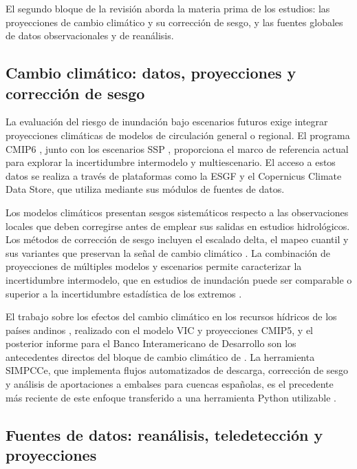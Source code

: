 El segundo bloque de la revisión aborda la materia prima de los estudios: las proyecciones de cambio climático y su corrección de sesgo, y las fuentes globales de datos observacionales y de reanálisis.

\subsection{Cambio climático: datos, proyecciones y corrección de sesgo}
\label{sec:cambio_climatico}

La evaluación del riesgo de inundación bajo escenarios futuros exige integrar proyecciones climáticas de modelos de circulación general o regional. El programa CMIP6 \parencite{eyring2016cmip6}, junto con los escenarios SSP \parencite{oneill2016ssp}, proporciona el marco de referencia actual para explorar la incertidumbre intermodelo y multiescenario. El acceso a estos datos se realiza a través de plataformas como la ESGF y el Copernicus Climate Data Store, que \hydra utiliza mediante sus módulos de fuentes de datos.

Los modelos climáticos presentan sesgos sistemáticos respecto a las observaciones locales que deben corregirse antes de emplear sus salidas en estudios hidrológicos. Los métodos de corrección de sesgo incluyen el escalado delta, el mapeo cuantil y sus variantes que preservan la señal de cambio climático \parencite{gudmundsson2012downscaling,teutschbein2012biascorrection}. La combinación de proyecciones de múltiples modelos y escenarios permite caracterizar la incertidumbre intermodelo, que en estudios de inundación puede ser comparable o superior a la incertidumbre estadística de los extremos \parencite{cloke2013modelling,smith2014comparing}.

El trabajo sobre los efectos del cambio climático en los recursos hídricos de los países andinos \parencite{deljesus2020andinos}, realizado con el modelo VIC y proyecciones CMIP5, y el posterior informe para el Banco Interamericano de Desarrollo \parencite{paz2019idb} son los antecedentes directos del bloque de cambio climático de \pyhydra. La herramienta SIMPCCe, que implementa flujos automatizados de descarga, corrección de sesgo y análisis de aportaciones a embalses para cuencas españolas, es el precedente más reciente de este enfoque transferido a una herramienta Python utilizable \parencite{navas2025simpce}.

\subsection{Fuentes de datos: reanálisis, teledetección y proyecciones}
\label{sec:fuentes_datos_arte}

